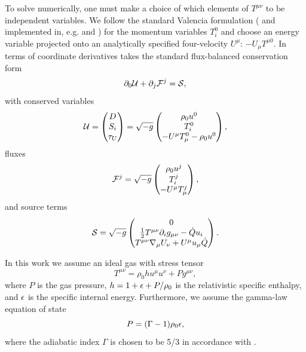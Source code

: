 To solve  numerically, one must make a choice of which elements of $T^{\mu\nu}$ to be independent variables.  We follow the standard Valencia formulation (\citealt{Marti91, Banyuls97,Font08} and implemented in, e.g. \citealt{HARM} and \citealt{Duez05}) for the momentum variables $T^0_i$ and choose an energy variable projected onto an analytically specified four-velocity $U^\mu$: $-U_\mu T^{\mu 0}$.
In terms of coordinate derivatives  takes the standard flux-balanced conservation form
\begin{equation}
    \pd_0 \mathcal{U} + \pd_j \mathcal{F}^j = \mathcal{S} , \eqlabel{consLaw}
\end{equation}
with conserved variables
\begin{equation}
    \mathcal{U} = \begin{pmatrix} D \\
                            S_i \\
                            \tau_U
                \end{pmatrix} = \sqrt{-g} \begin{pmatrix} \rho_0 u^0 \\ 
                                                    T^0_i \\
                                                    -U^\mu T_\mu^0 - \rho_0 u^0 \end{pmatrix} , \eqlabel{cons}
\end{equation}
fluxes
\begin{equation}
    \mathcal{F}^j = \sqrt{-g} \begin{pmatrix} \rho_0 u^j \\
                                                T^j_i \\
                                                -U^\mu T_\mu^j \end{pmatrix} ,\eqlabel{fluxes}
\end{equation}
and source terms 
\begin{equation}
    \mathcal{S} = \sqrt{-g} \begin{pmatrix} 0 \\
                        \frac{1}{2}T^{\mu\nu}\pd_i g_{\mu\nu} - \dot{Q}u_i \\
                        T^{\mu\nu}\nabla_\mu U_\nu + U^\mu u_\mu \dot{Q} \end{pmatrix} .\eqlabel{sources}
\end{equation}

In this work we assume an ideal gas with stress tensor
\begin{equation}
	T^{\mu\nu} = \rho_0 h u^\mu u^\nu + P g^{\mu\nu} ,
\end{equation}
where $P$ is the gas pressure, $h = 1 + \epsilon + P/\rho_0$ is the relativistic specific enthalpy, and $\epsilon$ is the specific internal energy. Furthermore, we assume the gamma-law equation of state
\begin{equation}
	P = (\Gam - 1) \rho_0 \eps , \eqlabel{gammalaw}
\end{equation}
where the adiabatic index $\Gamma$ is chosen to be 5/3 in accordance with \cite{Farris14}.

